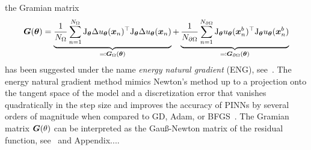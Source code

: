the Gramian matrix 
\begin{equation}
  \mG(\vtheta) = %
  \underbrace{\frac1{{N_\Omega}} \sum_{n=1}^{N_\Omega} \jac_{\vtheta} \Delta u_\vtheta(\vx_n)^\top \jac_{\vtheta} \Delta u_\vtheta(\vx_n)}_{\eqqcolon \mG_\Omega(\vtheta)} + \underbrace{\frac1{{N_{\partial\Omega}}} \sum_{n=1}^{N_{\partial\Omega}} \jac_{\vtheta} u_\vtheta(\vx_n^b)^\top \jac_{\vtheta} u_\vtheta (\vx_n^b)}_{\eqqcolon \mG_{\partial\Omega}(\vtheta)}
\end{equation}
has been suggested under the name \emph{energy natural gradient} (ENG), see~\cite{muller2023achieving}. 
The energy natural gradient method mimics Newton's method up to a projection onto the tangent space of the model and a discretization error that vanishes quadratically in the step size 
and improves the accuracy of PINNs by several orders of magnitude when compared to GD, Adam, or BFGS~\citep{muller2023achieving, ?}. 
The Gramian matrix ${\bm{G}}(\theta)$ can be interpreted as the Gauß-Newton matrix of the residual function, see~\cite{} and Appendix....


